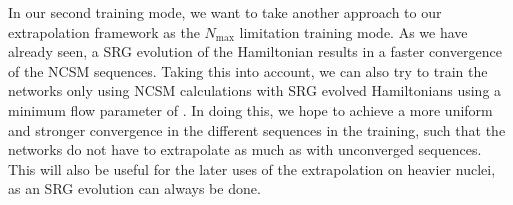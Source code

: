 In our second training mode, we want to take another approach to our extrapolation framework as the $N_\mathrm{max}$ limitation training mode. As we have already seen, a SRG evolution of the Hamiltonian results in a faster convergence of the NCSM sequences. Taking this into account, we can also try to train the networks only using NCSM calculations with SRG evolved Hamiltonians using a minimum flow parameter of . In doing this, we hope to achieve a more uniform and stronger convergence in the different sequences in the training, such that the networks do not have to extrapolate as much as with unconverged sequences. This will also be useful for the later uses of the extrapolation on heavier nuclei, as an SRG evolution can always be done.
